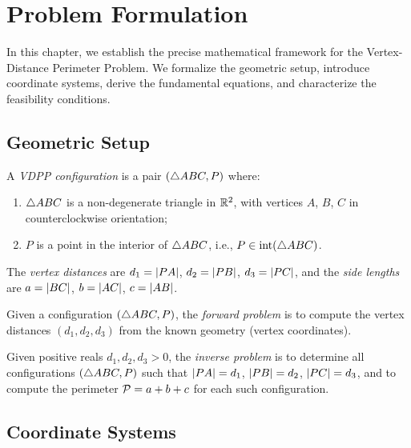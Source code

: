 
\chapter{Problem Formulation}
\label{ch:formulation}

In this chapter, we establish the precise mathematical framework for the Vertex-Distance Perimeter Problem. We formalize the geometric setup, introduce coordinate systems, derive the fundamental equations, and characterize the feasibility conditions.

\section{Geometric Setup}

\begin{definition}[Configuration]
\label{def:configuration}
A \emph{VDPP configuration} is a pair $(\triangle ABC, P)$ where:
\begin{enumerate}[label=(\roman*)]
    \item $\triangle ABC$ is a non-degenerate triangle in $\mathbb{R}^2$, with vertices $A$, $B$, $C$ in counterclockwise orientation;
    \item $P$ is a point in the interior of $\triangle ABC$, i.e., $P \in \operatorname{int}(\triangle ABC)$.
\end{enumerate}
The \emph{vertex distances} are $d_1 = \left\lvert PA \right\rvert$, $d_2 = \left\lvert PB \right\rvert$, $d_3 = \left\lvert PC \right\rvert$, and the \emph{side lengths} are $a = \left\lvert BC \right\rvert$, $b = \left\lvert AC \right\rvert$, $c = \left\lvert AB \right\rvert$.
\end{definition}

\begin{definition}
Given a configuration $(\triangle ABC, P)$, the \emph{forward problem} is to compute the vertex distances $(d_1, d_2, d_3)$ from the known geometry (vertex coordinates).
\end{definition}

\begin{definition}
Given positive reals $d_1, d_2, d_3 > 0$, the \emph{inverse problem} is to determine all configurations $(\triangle ABC, P)$ such that $\left\lvert PA \right\rvert = d_1$, $\left\lvert PB \right\rvert = d_2$, $\left\lvert PC \right\rvert = d_3$, and to compute the perimeter $\mathcal{P} = a + b + c$ for each such configuration.
\end{definition}

\section{Coordinate Systems}

